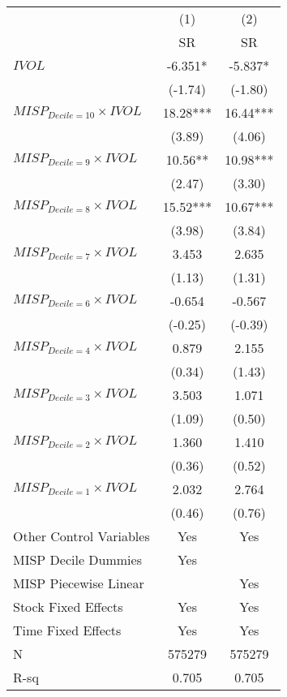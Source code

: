 \begin{tabular}{lcc}
\toprule
      & (1)   & (2) \\
      & SR    & SR \\
\midrule
$IVOL$ & -6.351* & -5.837* \\
      & (-1.74) & (-1.80) \\
$MISP_{Decile = 10} \times IVOL$ & 18.28*** & 16.44*** \\
      & (3.89) & (4.06) \\
$MISP_{Decile = 9} \times IVOL$ & 10.56** & 10.98*** \\
      & (2.47) & (3.30) \\
$MISP_{Decile = 8} \times IVOL$ & 15.52*** & 10.67*** \\
      & (3.98) & (3.84) \\
$MISP_{Decile = 7} \times IVOL$ & 3.453 & 2.635 \\
      & (1.13) & (1.31) \\
$MISP_{Decile = 6} \times IVOL$ & -0.654 & -0.567 \\
      & (-0.25) & (-0.39) \\
$MISP_{Decile = 4} \times IVOL$ & 0.879 & 2.155 \\
      & (0.34) & (1.43) \\
$MISP_{Decile = 3} \times IVOL$ & 3.503 & 1.071 \\
      & (1.09) & (0.50) \\
$MISP_{Decile = 2} \times IVOL$ & 1.360 & 1.410 \\
      & (0.36) & (0.52) \\
$MISP_{Decile = 1} \times IVOL$ & 2.032 & 2.764 \\
      & (0.46) & (0.76) \\
\midrule
Other Control Variables & Yes   & Yes \\
MISP Decile Dummies & Yes   &  \\
MISP Piecewise Linear &       & Yes \\
Stock Fixed Effects & Yes   & Yes \\
Time Fixed Effects & Yes   & Yes \\
N     & 575279 & 575279 \\
R-sq  & 0.705 & 0.705 \\
\bottomrule
\end{tabular}%
